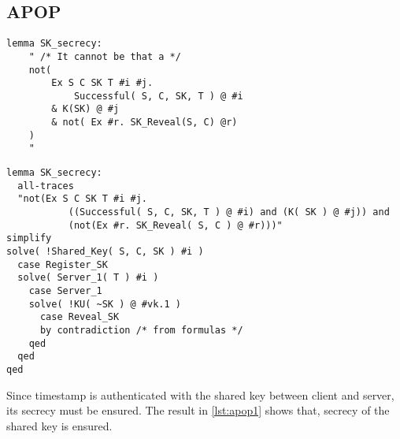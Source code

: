 \documentclass[a4paper, 12pt, titlepage]{article}
\begin{document}
\subsection{APOP}
\begin{lstlisting}[caption = Implementation of shared key secrecy lemma of APOP]
lemma SK_secrecy:
	" /* It cannot be that a */
	not(
		Ex S C SK T #i #j.
			Successful( S, C, SK, T ) @ #i
		& K(SK) @ #j
		& not( Ex #r. SK_Reveal(S, C) @r)
	)
	"
\end{lstlisting}
\begin{lstlisting}[caption = Execution results are positive for shared key secrecy lemma of APOP, label = {lst:apop1}]
lemma SK_secrecy:
  all-traces
  "not(Ex S C SK T #i #j.
           ((Successful( S, C, SK, T ) @ #i) and (K( SK ) @ #j)) and
           (not(Ex #r. SK_Reveal( S, C ) @ #r)))"
simplify
solve( !Shared_Key( S, C, SK ) #i )
  case Register_SK
  solve( Server_1( T ) #i )
    case Server_1
    solve( !KU( ~SK ) @ #vk.1 )
      case Reveal_SK
      by contradiction /* from formulas */
    qed
  qed
qed
\end{lstlisting}
Since timestamp is authenticated with the shared key between client and server, its secrecy must be ensured. The result in \ref{lst:apop1} shows that, secrecy of the shared key is ensured.
\end{document}

